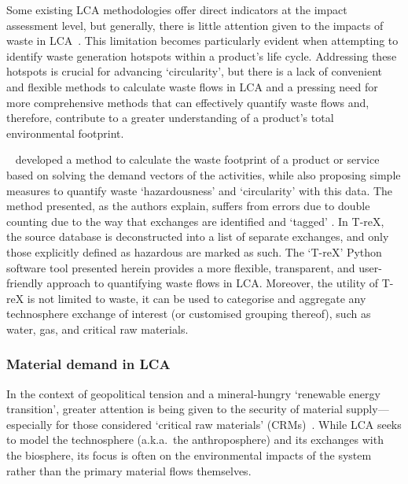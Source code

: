\documentclass[a4paper,fleqn]{cas-dc}
\begin{document}
Some existing LCA methodologies offer direct indicators at the impact
assessment level, but generally, there is little attention given to the impacts
of waste in LCA~\citep{lauran2020abioticdepletion}. This limitation becomes
particularly evident when attempting to identify waste generation hotspots
within a product's life cycle. Addressing these hotspots is crucial for
advancing `circularity', but there is a lack of convenient and flexible methods
to calculate waste flows in LCA and a pressing need for more comprehensive
methods that can effectively quantify waste flows and, therefore, contribute to
a greater understanding of a product's total environmental footprint.

~\cite{laurenti2023wastefootprint} developed a method to calculate the waste footprint of a product or service based on solving the demand vectors of the activities, while also proposing simple measures to quantify waste `hazardousness' and `circularity' with this data. The method presented, as the authors explain, suffers from errors due to double counting due to the way that exchanges are identified and `tagged' . In T-reX, the source database is deconstructed into a list of separate exchanges, and only those explicitly defined as hazardous are marked as such. The `T-reX' Python software tool presented herein provides a more flexible, transparent, and user-friendly approach to quantifying waste flows in LCA\@. Moreover, the utility of T-reX is not limited to waste, it can be used to categorise and aggregate any technosphere exchange of interest (or customised grouping thereof), such as water, gas, and critical raw materials.

\subsubsection{Material demand in LCA}\label{sec:intro-material}

In the context of geopolitical tension and a mineral-hungry `renewable energy
transition', greater attention is being given to the security of material
supply---especially for those considered `critical raw materials'
(CRMs)~\citep{eu2023crmstudy,hool2023crm,mancini2013supplysecurity,jrc2023supplychain,hartley2024cepolitics,salviulo2021supplychain,iea2023crm,iea2023energytechperspectives}.
While LCA seeks to model the technosphere (a.k.a.\ the anthroposphere) and its
exchanges with the biosphere, its focus is often on the environmental impacts
of the system rather than the primary material flows themselves.
\end{document}
